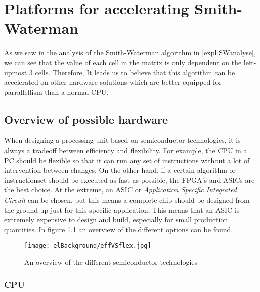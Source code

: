 
\chapter{Platforms for accelerating Smith-Waterman}
\label{ch:Platforms}

As we saw in the analysis of the Smith-Waterman algorithm in \ref{expl:SWanalyse}, we can see that the value of each cell in the matrix is only dependent on the left-upmost 3 cells. Therefore, It leads us to believe that this algorithm can be accelerated on other hardware solutions which are better equipped for parrallellism than a normal CPU.

\section{Overview of possible hardware}

When designing a processing unit based on semiconductor technologies, it is always a tradeoff between efficiency and flexibility. For example, the CPU in a PC should be flexible so that it can run any set of instructions without a lot of intervention between changes. On the other hand, if a certain algorithm or instructionset should be executed as fast as possible, the FPGA's and ASICs are the best choice. At the extreme, an ASIC or \emph{Application Specific Integrated Circuit} can be chosen, but this means a complete chip should be designed from the ground up just for this specific application. This means that an ASIC is extremely expensive to design and build, especially for small production quantities. In figure \ref{fig:effVSflex} an overview of the different options can be found.

\begin{figure}[H]
	\centering
	\texttt{[image: elBackground/effVSflex.jpg]}
	\caption{An overview of the different semiconductor technologies}
	\label{fig:effVSflex}
\end{figure}

\subsection{CPU}

